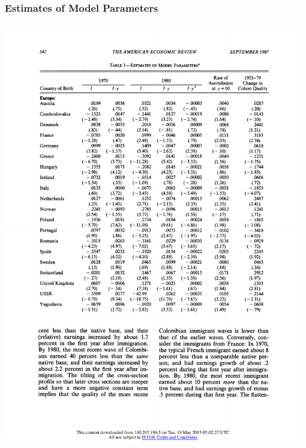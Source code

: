 \documentclass[10pt]{beamer}
\begin{document}
\begin{frame}[t]\frametitle{Estimates of Model Parameters}

\centerline{\includegraphics[height=0.9\textheight]{ModReg1.pdf}}

\end{frame}
\end{document}
